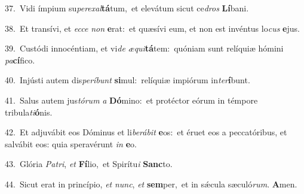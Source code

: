 {\numbfont\textcolor{\numbcolor}{37.}}~Vidi ímpium su\-\textit{per}\-\textit{ex}\textit{al}\textbf{tá}tum,~\star et elevátum sicut ce\textit{dros} \textbf{Lí}\-bani.\par
{\numbfont\textcolor{\numbcolor}{38.}}~Et transívi, et \textit{ec}\-\textit{ce} \textit{non} \textbf{e}\-rat:~\star et quæsívi eum, et non est invéntus lo\textit{cus} \textbf{e}\-jus.\par
{\numbfont\textcolor{\numbcolor}{39.}}~Custódi innocéntiam, et vi\textit{de} \textit{æ}\-\textit{qui}\textbf{tá}tem:~\star quóniam sunt relíquiæ hómini \textit{pa}\-\textbf{cí}fico.\par
{\numbfont\textcolor{\numbcolor}{40.}}~Injústi autem dis\-\textit{per}\-\textit{í}\textit{bunt} \textbf{si}\-mul:~\star relíquiæ impiórum in\-\textit{ter}\-\textbf{í}bunt.\par
{\numbfont\textcolor{\numbcolor}{41.}}~Salus autem jus\-\textit{tó}\-\textit{rum} \textit{a} \textbf{Dó}\-mino:~\star et protéctor eórum in témpore tribula\-\textit{ti}\-\textbf{ó}nis.\par
{\numbfont\textcolor{\numbcolor}{42.}}~Et adjuvábit eos Dóminus et li\-\textit{be}\-\textit{rá}\textit{bit} \textbf{e}\-os:~\star et éruet eos a peccatóribus, et salvábit eos: quia speravérunt \textit{in} \textbf{e}\-o.\par
{\numbfont\textcolor{\numbcolor}{43.}}~Glória \textit{Pa}\-\textit{tri}, \textit{et} \textbf{Fí}\-lio,~\star et Spirítu\textit{i} \textbf{Sanc}\-to.\par
{\numbfont\textcolor{\numbcolor}{44.}}~Sicut erat in princípio, \textit{et} \textit{nunc}\-, \textit{et} \textbf{sem}\-per,~\star et in sǽcula sæculó\-\textit{rum}\-. \textbf{A}\-men.\par
